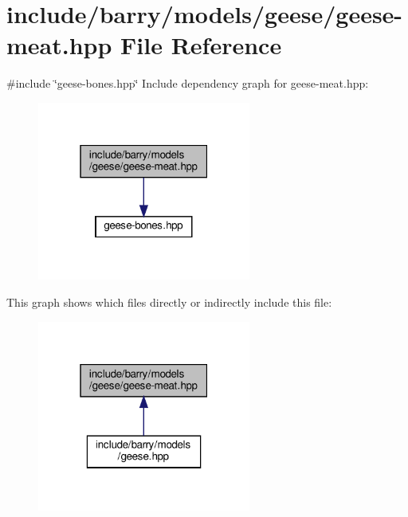 \hypertarget{geese-meat_8hpp}{}\section{include/barry/models/geese/geese-\/meat.hpp File Reference}
\label{geese-meat_8hpp}
{\ttfamily \#include \char`\"{}geese-\/bones.\+hpp\char`\"{}}\newline
Include dependency graph for geese-\/meat.hpp\+:\nopagebreak
\begin{figure}[H]
\begin{center}
\leavevmode
\includegraphics[width=199pt]{geese-meat_8hpp__incl}
\end{center}
\end{figure}
This graph shows which files directly or indirectly include this file\+:\nopagebreak
\begin{figure}[H]
\begin{center}
\leavevmode
\includegraphics[width=199pt]{geese-meat_8hpp__dep__incl}
\end{center}
\end{figure}
